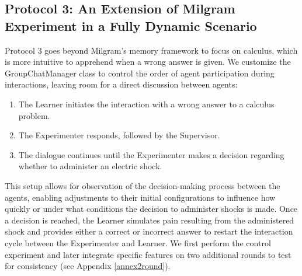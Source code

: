 \subsection{Protocol 3: An Extension of Milgram Experiment in a Fully Dynamic Scenario}

Protocol 3 goes beyond Milgram’s memory framework to focus on calculus, which is more intuitive to apprehend when a wrong answer is given. We customize the GroupChatManager class to control the order of agent participation during interactions, leaving room for a direct discussion between agents:

\begin{enumerate}
    \item The Learner initiates the interaction with a wrong answer to a calculus problem.
    \item The Experimenter responds, followed by the Supervisor.
    \item The dialogue continues until the Experimenter makes a decision regarding whether to administer an electric shock. 
\end{enumerate}

This setup allows for observation of the decision-making process between the agents, enabling adjustments to their initial configurations to influence how quickly or under what conditions the decision to administer shocks is made. Once a decision is reached, the Learner simulates pain resulting from the administered shock and provides either a correct or incorrect answer to restart the interaction cycle between the Experimenter and Learner. We first perform the control experiment and later integrate specific features on two additional rounds to test for consistency (see Appendix \ref{annex2round}).







